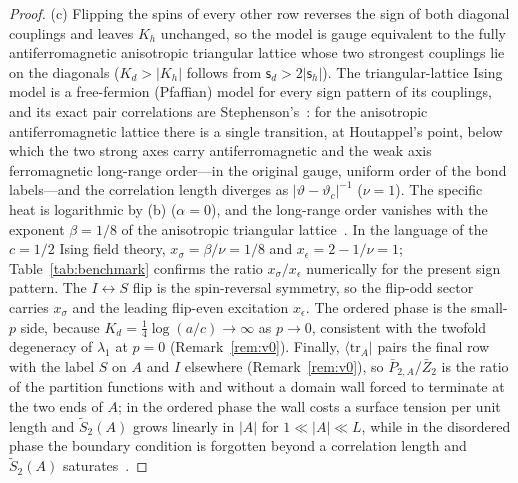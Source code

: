 \documentclass[aps,prx,reprint,superscriptaddress,nobibnotes,longbibliography]{revtex4-2}
\theoremstyle{remark}
\newcommand{\vth}{\vartheta}
\begin{document}
\begin{proof}
(c) Flipping the spins of every other row reverses the sign of both diagonal couplings and leaves $K_h$ unchanged, so the model is gauge equivalent to the fully antiferromagnetic anisotropic triangular lattice whose two strongest couplings lie on the diagonals ($K_d>|K_h|$ follows from $\mathsf s_d>2|\mathsf s_h|$).  The triangular-lattice Ising model is a free-fermion (Pfaffian) model for every sign pattern of its couplings, and its exact pair correlations are Stephenson's~\cite{Stephenson1964,Stephenson1970}: for the anisotropic antiferromagnetic lattice there is a single transition, at Houtappel's point, below which the two strong axes carry antiferromagnetic and the weak axis ferromagnetic long-range order---in the original gauge, uniform order of the bond labels---and the correlation length diverges as $|\vth-\vth_c|^{-1}$ ($\nu=1$).  The specific heat is logarithmic by (b) ($\alpha=0$), and the long-range order vanishes with the exponent $\beta=1/8$ of the anisotropic triangular lattice~\cite{Potts1952,Stephenson1970}.  In the language of the $c=1/2$ Ising field theory, $x_\sigma=\beta/\nu=1/8$ and $x_\epsilon=2-1/\nu=1$; Table~\ref{tab:benchmark} confirms the ratio $x_\sigma/x_\epsilon$ numerically for the present sign pattern.  The $I\leftrightarrow S$ flip is the spin-reversal symmetry, so the flip-odd sector carries $x_\sigma$ and the leading flip-even excitation $x_\epsilon$.  The ordered phase is the small-$p$ side, because $K_d=\frac14\log(a/c)\to\infty$ as $p\to0$, consistent with the twofold degeneracy of $\lambda_1$ at $p=0$ (Remark~\ref{rem:v0}).  Finally, $\langle\mathrm{tr}_A|$ pairs the final row with the label $S$ on $A$ and $I$ elsewhere (Remark~\ref{rem:v0}), so $\bar P_{2,A}/\bar Z_2$ is the ratio of the partition functions with and without a domain wall forced to terminate at the two ends of $A$; in the ordered phase the wall costs a surface tension per unit length and $\tilde S_2(A)$ grows linearly in $|A|$ for $1\ll|A|\ll L$, while in the disordered phase the boundary condition is forgotten beyond a correlation length and $\tilde S_2(A)$ saturates~\cite{Bao2020}.
\end{proof}
\end{document}
